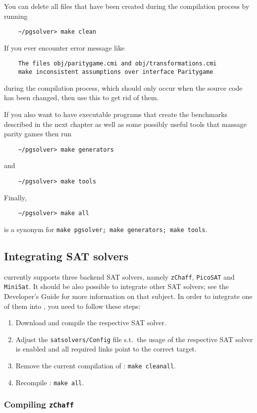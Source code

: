 You can delete all files that have been created during the compilation process by running
\begin{verbatim}
    ~/pgsolver> make clean
\end{verbatim}
If you ever encounter error message like
\begin{verbatim}
    The files obj/paritygame.cmi and obj/transformations.cmi
    make inconsistent assumptions over interface Paritygame
\end{verbatim}
during the compilation process, which should only occur when the source code has been changed, then
use this to get rid of them.

If you also want to have executable programs that create the benchmarks described in the next
chapter as well as some possibly useful tools that massage parity games then run
\begin{verbatim}
    ~/pgsolver> make generators
\end{verbatim}
and
\begin{verbatim}
    ~/pgsolver> make tools
\end{verbatim}
Finally,
\begin{verbatim}
    ~/pgsolver> make all
\end{verbatim}
is a synonym for \verb#make pgsolver; make generators; make tools#.


\subsection{Integrating SAT solvers}

\pgsolver currently supports three backend SAT solvers, namely \texttt{zChaff}, \texttt{PicoSAT} and
\texttt{MiniSat}. It should be also possible to integrate other SAT solvers; see the Developer's Guide for
more information on that subject. In order to integrate one of them into \pgsolver, you need to follow these
steps:
\begin{enumerate}
\item Download and compile the respective SAT solver.
\item Adjust the \texttt{satsolvers/Config} file s.t.\ the usage of the respective SAT solver is enabled and all required links point to the correct target.
\item Remove the current compilation of \pgsolver: \verb#make cleanall#.
\item Recompile \pgsolver: \verb#make all#.
\end{enumerate}


\subsubsection{Compiling \texttt{zChaff}}


